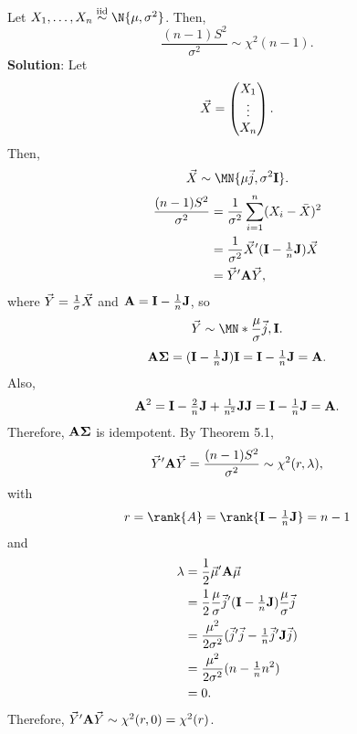 \begin{Example}{}{}
      Let $ X_1,\ldots,X_n \iid \N{\mu,\sigma^2} $. Then,
      \[ \frac{(n-1)S^2}{\sigma^2} \sim \chi^2(n-1). \]
      \tcblower{}
      \textbf{Solution}:
      Let
      \[ \vec{X}=\begin{pmatrix}
                  X_1    \\
                  \vdots \\
                  X_n
            \end{pmatrix}. \]
      Then,
      \[ \Vector{X} \sim \MN{\mu \Vector{j},\sigma^2 \Matrix{I}}. \]
      \begin{align*}
            \frac{(n-1)S^2}{\sigma^2}
             & =\frac{1}{\sigma^2}\sum_{i=1}^{n}(X_i-\bar{X})^2                            \\
             & =\frac{1}{\sigma^2}\vec{X}'(\mathbf{I}-\tfrac{1}{n}\mathbf{J})\vec{X} \\
             & =\vec{Y}'\mathbf{A}\vec{Y},
      \end{align*}
      where $ \vec{Y}=\frac{1}{\sigma}\vec{X} $ and $ \mathbf{A}=\mathbf{I}-\tfrac{1}{n}\mathbf{J} $, so
      \[ \Vector{Y}\sim \MN*{\frac{\mu}{\sigma}\Vector{j},\Matrix{I}}. \]
      \[ \mathbf{A\Sigma}=(\mathbf{I}-\tfrac{1}{n}\mathbf{J})\mathbf{I}=\mathbf{I}-\tfrac{1}{n}\mathbf{J}=\mathbf{A}. \]
      Also,
      \[ \mathbf{A}^2=\mathbf{I}-\tfrac{2}{n}\mathbf{J}+\tfrac{1}{n^2}\mathbf{J}\mathbf{J}=\mathbf{I}-\tfrac{1}{n}\mathbf{J}=\mathbf{A}. \]
      Therefore, $ \mathbf{A\Sigma} $ is idempotent. By Theorem 5.1,
      \[ \vec{Y}'\mathbf{A}\vec{Y}=\frac{(n-1)S^2}{\sigma^2}\sim \chi^2(r,\lambda), \]
      with
      \[ r=\rank{A}=\rank{\Matrix{I}-\tfrac{1}{n}\Matrix{J}}=n-1 \]
      and
      \begin{align*}
            \lambda
             & =\frac{1}{2}\vec{\mu}'\mathbf{A}\vec{\mu}                                                          \\
             & =\frac{1}{2}\frac{\mu}{\sigma}\vec{j}'(\mathbf{I}-\tfrac{1}{n}\mathbf{J})\frac{\mu}{\sigma}\vec{j} \\
             & =\frac{\mu^2}{2\sigma^2}(\vec{j}'\vec{j}-\tfrac{1}{n}\vec{j}'\mathbf{J}\vec{j})              \\
             & =\frac{\mu^2}{2\sigma^2}(n-\tfrac{1}{n}n^2)                                                              \\
             & =0.
      \end{align*}
      Therefore, $ \vec{Y}'\mathbf{A}\vec{Y} \sim \chi^2(r,0)=\chi^2(r) $.
\end{Example}